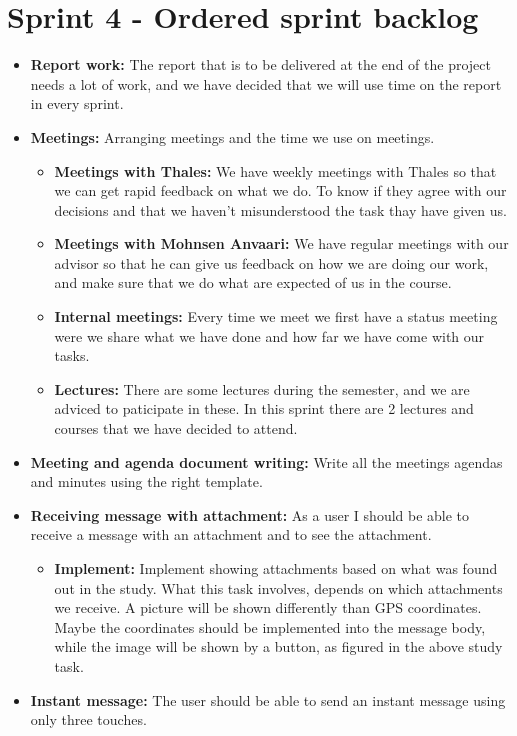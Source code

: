 \section{Sprint 4 - Ordered sprint backlog}

\begin{itemize}
\item{}\textbf{Report work:} The report that is to be delivered at the end of the project needs a lot of work, and we have decided that we will use time on the report in every sprint.
\item{}\textbf{Meetings:} Arranging meetings and the time we use on meetings.
\begin{itemize}
\item{}\textbf{Meetings with Thales:} We have weekly meetings with Thales so that we can get rapid feedback on what we do. To know if they agree with our decisions and that we haven't misunderstood the task thay have given us.
\item{}\textbf{Meetings with Mohnsen Anvaari:} We have regular meetings with our advisor so that he can give us feedback on how we are doing our work, and make sure that we do what are expected of us in the course.
\item{}\textbf{Internal meetings:} Every time we meet we first have a status meeting were we share what we have done and how far we have come with our tasks.
\item{}\textbf{Lectures:} There are some lectures during the semester, and we are adviced to paticipate in these. In this sprint there are 2 lectures and courses that we have decided to attend.
\end{itemize}
\item{}\textbf{Meeting and agenda document writing:} Write all the meetings agendas and minutes using the right template.
\item{}\textbf{Receiving message with attachment:} As a user I should be able to receive a message with an attachment and to see the attachment.
\begin{itemize}
\item{}\textbf{Implement:} Implement showing attachments based on what was found out in the study. What this task involves, depends on which attachments we receive. A picture will be shown differently than GPS coordinates. Maybe the coordinates should be implemented into the message body, while the image will be shown by a button, as figured in the above study task.
\end{itemize}
\item{}\textbf{Instant message:} The user should be able to send an instant message using only three touches.

\end{itemize}
